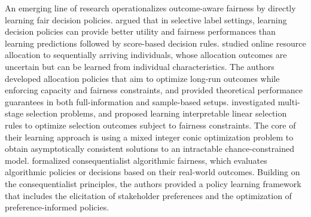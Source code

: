\documentclass[ijoc,sglanonrev]{informs4}
\begin{document}
An emerging line of research operationalizes outcome-aware fairness by directly learning fair decision policies. \citet{kilbertus2020fair} argued that in selective label settings, learning decision policies can provide better utility and fairness performances than learning predictions followed by score-based decision rules. 
\citet{tang2023learning} studied online resource allocation to sequentially arriving individuals, whose allocation outcomes are uncertain but can be learned from individual characteristics. The authors developed allocation policies that aim to optimize long-run outcomes while enforcing capacity and fairness constraints, and provided theoretical performance guarantees in both full-information and sample-based setups. 
\citet{jia2024learning} investigated multi-stage selection problems, and proposed learning interpretable linear selection rules to optimize selection outcomes subject to fairness constraints. The core of their learning approach is using a mixed integer conic optimization problem to obtain asymptotically consistent solutions to an intractable chance-constrained model. 
\citet{chohlas2024learning} formalized consequentialist algorithmic fairness, which evaluates algorithmic policies or decisions based on their real-world outcomes. Building on the consequentialist principles, the authors provided a policy learning framework that includes the elicitation of stakeholder preferences and the optimization of preference-informed policies.

\end{document}
